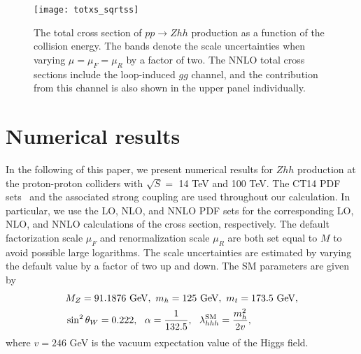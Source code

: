 \documentclass[a4paper,amsmath,preprintnumbers,showpacs,twocolumn,prl,superscriptaddress, nofootinbib]{revtex4}
\newcommand{\nn}{\nonumber}
\begin{document}
\begin{figure}
    \texttt{[image: totxs\_sqrtss]}\\
  \caption{The total cross section of $pp\to Zhh$ production as a function of the collision energy.
The bands denote the scale uncertainties when varying $\mu=\mu_F=\mu_R$ by a factor of two.  The NNLO total cross sections include the loop-induced $gg$ channel,  and the contribution from this channel is also shown in the upper panel individually.  }
  \label{fig:sqrts}
\end{figure}


\section{Numerical results}
In the following of this paper, we present  numerical results for $Zhh$ production at the proton-proton colliders 
with $\sqrt{S}=$ 14 TeV and 100 TeV. The  CT14 PDF sets~\cite{Dulat:2015mca} and the associated strong coupling are used 
throughout our calculation. 
In particular, we use the LO, NLO, and NNLO PDF sets for the corresponding LO, NLO, and NNLO calculations of the cross section,
respectively.
The default factorization scale $\mu_F$ and renormalization scale $\mu_R$ are both set equal to $M$  to avoid possible large logarithms. 
The scale uncertainties are estimated by varying the default value by a factor of two up and down.
The SM parameters are given by
\begin{align}
 & M_Z = 91.1876 ~\textrm{GeV}, ~
 m_h = 125 ~\textrm{GeV},~
 m_t = 173.5 ~\textrm{GeV},
 \nn \\
& \sin^2 \theta_W = 0.222,~~ \alpha = \frac{1}{132.5},  ~~ \lambda_{hhh}^{\rm SM} = \frac{m_h^2}{2v},
\end{align}
where $v=246$ GeV is the vacuum expectation value of the Higgs field. 
\end{document}
